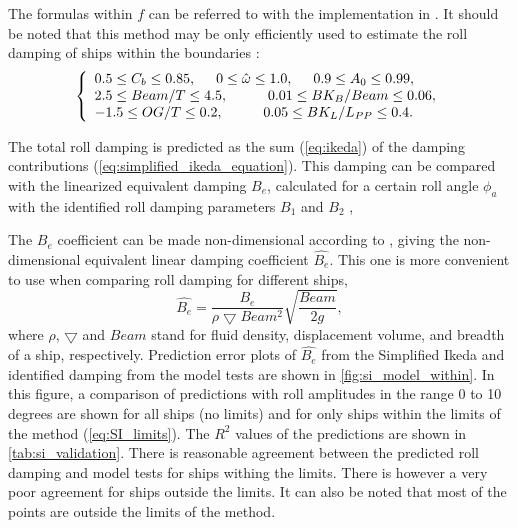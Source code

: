 \noindent The formulas within $f$ can be referred to \parencite{ikeda_velocity_1979, kawahara_simple_2011} with the implementation in \cite{alexandersson_martinlarsalbertrolldecay-estimators_2020}.
It should be noted that this method may be only efficiently used to estimate the roll damping of ships within the boundaries \parencite{kawahara_simple_2011}:
\begin{equation}
    \label{eq:SI_limits}
     \left\{
     \begin{array}{ll}
    0.5 \leq C_b \leq 0.85,\hspace{0.5cm} 
    0 \leq \hat{\omega} \leq 1.0,
    \hspace{0.5cm}
    0.9 \leq A_0 \leq 0.99,\\
    2.5\leq Beam/T \leq 4.5, \hspace{1cm}
    0.01 \leq BK_B/Beam \leq 0.06, \\
        -1.5 \leq OG/T \leq 0.2,
     \hspace{1cm}
    0.05 \leq BK_L/L_{PP} \leq 0.4.
    \end{array}
    \right.
\end{equation}

\noindent The total roll damping is predicted as the sum (\autoref{eq:ikeda}) of the damping contributions (\autoref{eq:simplified_ikeda_equation}). This damping can be compared with the linearized equivalent damping $B_e$, calculated for a certain roll angle $\phi_a$ with the identified roll damping parameters $B_1$ and $B_2$ \cite{himeno_prediction_1981},


\noindent The $B_e$ coefficient can be made non-dimensional according to \parencite{himeno_prediction_1981}, giving the non-dimensional equivalent linear damping coefficient $\hat{B_e}$. This one is more convenient to use when comparing roll damping for different ships,
\begin{equation} \label{eq:be_eqvalent}
    \hat{B_e} = \frac{B_e}{\rho \bigtriangledown Beam^2} \sqrt{\frac{Beam}{2g}},
\end{equation}
\noindent where $\rho$, $\bigtriangledown$ and $Beam$ stand for fluid density, displacement volume, and breadth of a ship, respectively. Prediction error plots of $\hat{B_e}$ from the Simplified Ikeda and identified damping from the model tests are shown in \autoref{fig:si_model_within}. In this figure, a comparison of predictions with roll amplitudes in the range 0 to 10 degrees are shown for all ships (no limits) and for only ships within the limits of the method (\autoref{eq:SI_limits}). The $R^2$ values of the predictions are shown in \autoref{tab:si_validation}. There is reasonable agreement between the predicted roll damping and model tests for ships withing the limits. There is however a very poor agreement for ships outside the limits. It can also be noted that most of the points are outside the limits of the method.

